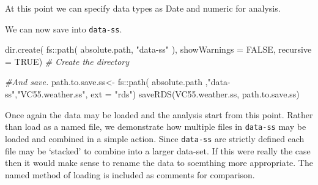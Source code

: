 \documentclass{article}
\newenvironment{Shaded}{\begin{snugshade}}{\end{snugshade}}
\newcommand{\AttributeTok}[1]{\textcolor[rgb]{0.77,0.63,0.00}{#1}}
\newcommand{\CommentTok}[1]{\textcolor[rgb]{0.56,0.35,0.01}{\textit{#1}}}
\newcommand{\ConstantTok}[1]{\textcolor[rgb]{0.00,0.00,0.00}{#1}}
\newcommand{\FunctionTok}[1]{\textcolor[rgb]{0.00,0.00,0.00}{#1}}
\newcommand{\NormalTok}[1]{#1}
\newcommand{\OtherTok}[1]{\textcolor[rgb]{0.56,0.35,0.01}{#1}}
\newcommand{\SpecialCharTok}[1]{\textcolor[rgb]{0.00,0.00,0.00}{#1}}
\newcommand{\StringTok}[1]{\textcolor[rgb]{0.31,0.60,0.02}{#1}}
\begin{document}
At this point we can specify data types as Date and numeric for analysis.

\begin{Shaded}
\end{Shaded}

We can now save into \texttt{data-ss}.

\begin{Shaded}
\begin{Highlighting}[]
\FunctionTok{dir.create}\NormalTok{( }
\NormalTok{          fs}\SpecialCharTok{::}\FunctionTok{path}\NormalTok{( absolute.path,}
            \StringTok{"data{-}ss"}\NormalTok{ ),  }
            \AttributeTok{showWarnings =} \ConstantTok{FALSE}\NormalTok{,}
            \AttributeTok{recursive =} \ConstantTok{TRUE}\NormalTok{) }\CommentTok{\# Create the directory}

\CommentTok{\#And save.}
\NormalTok{path.to.save.ss}\OtherTok{\textless{}{-}}\NormalTok{ fs}\SpecialCharTok{::}\FunctionTok{path}\NormalTok{( absolute.path}
\NormalTok{                               ,}\StringTok{"data{-}ss"}\NormalTok{,}\StringTok{"VC55.weather.ss"}\NormalTok{, }\AttributeTok{ext =} \StringTok{"rds"}\NormalTok{)}
\FunctionTok{saveRDS}\NormalTok{(VC55.weather.ss, path.to.save.ss)}
\end{Highlighting}
\end{Shaded}

Once again the data may be loaded and the analysis start from this point. Rather than load as a named file, we demonstrate how multiple files in \texttt{data-ss} may be loaded and combined in a simple action. Since \texttt{data-ss} are strictly defined each file may be `stacked' to combine into a larger data-set. If this were really the case then it would make sense to rename the data to soemthing more appropriate. The named method of loading is included as comments for comparison.
\end{document}
